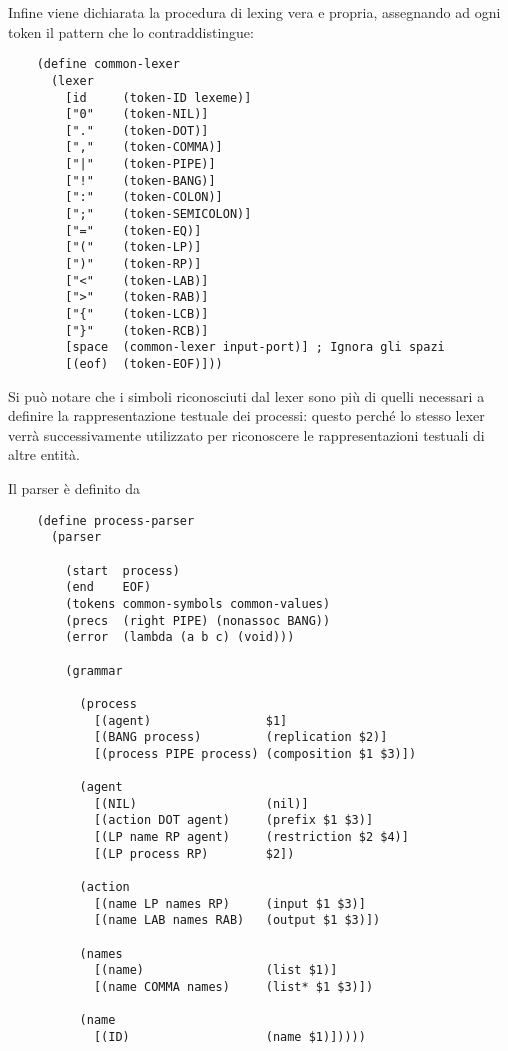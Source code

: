 Infine viene dichiarata la procedura di lexing vera e propria,
assegnando ad ogni token il pattern che lo contraddistingue:

\begin{lstlisting}
    (define common-lexer
      (lexer
        [id     (token-ID lexeme)]
        ["0"    (token-NIL)]
        ["."    (token-DOT)]
        [","    (token-COMMA)]
        ["|"    (token-PIPE)]
        ["!"    (token-BANG)]
        [":"    (token-COLON)]
        [";"    (token-SEMICOLON)]
        ["="    (token-EQ)]
        ["("    (token-LP)]
        [")"    (token-RP)]
        ["<"    (token-LAB)]
        [">"    (token-RAB)]
        ["{"    (token-LCB)]
        ["}"    (token-RCB)]
        [space  (common-lexer input-port)] ; Ignora gli spazi
        [(eof)  (token-EOF)]))
\end{lstlisting}

Si pu\`o notare che i simboli riconosciuti dal lexer sono pi\`u di
quelli necessari a definire la rappresentazione testuale dei processi:
questo perch\'e lo stesso lexer verr\`a successivamente utilizzato per
riconoscere le rappresentazioni testuali di altre entit\`a.

Il parser \`e definito da

\begin{lstlisting}
    (define process-parser
      (parser

        (start  process)
        (end    EOF)
        (tokens common-symbols common-values)
        (precs  (right PIPE) (nonassoc BANG))
        (error  (lambda (a b c) (void)))

        (grammar

          (process
            [(agent)                $1]
            [(BANG process)         (replication $2)]
            [(process PIPE process) (composition $1 $3)])

          (agent
            [(NIL)                  (nil)]
            [(action DOT agent)     (prefix $1 $3)]
            [(LP name RP agent)     (restriction $2 $4)]
            [(LP process RP)        $2])

          (action
            [(name LP names RP)     (input $1 $3)]
            [(name LAB names RAB)   (output $1 $3)])

          (names
            [(name)                 (list $1)]
            [(name COMMA names)     (list* $1 $3)])

          (name
            [(ID)                   (name $1)]))))
\end{lstlisting}

